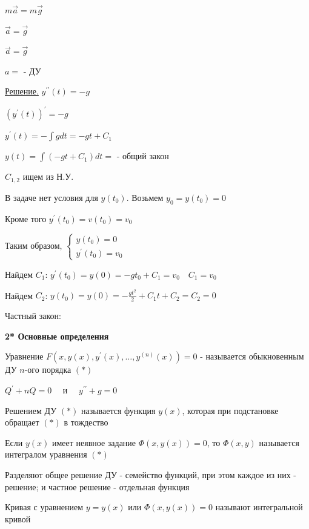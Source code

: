 \documentclass[12pt]{article}
\begin{document}
    $m\overrightarrow{a} = m\overrightarrow{g}$

    $\overrightarrow{a} = \overrightarrow{g}$

    $\overrightarrow{a} = \overrightarrow{g}$

    $a = $ - ДУ

    \underline{Решение.} \quad $y^{\prime\prime}(t) = -g$

    $(y^{\prime}(t))^\prime = -g$

    $y^{\prime}(t) = -\int g dt = -gt + C_1$

    $y(t) = \int (-gt + C_1) dt = $ - общий закон

    $C_{1,2}$ ищем из Н.У.

    В задаче нет условия для $y(t_0)$. Возьмем $y_0 = y(t_0) = 0$

    Кроме того $y^\prime(t_0) = v(t_0) = v_0$

    Таким образом, $\begin{cases}y(t_0) = 0 \\ y^\prime(t_0) = v_0\end{cases}$

    Найдем $C_1$: $y^\prime(t_0) = y(0) = -gt_0 + C_1 = v_0 \quad C_1 = v_0$

    Найдем $C_2$: $y(t_0) = y(0) = -\frac{gt^2}{2} + C_1 t + C_2 = C_2 = 0$

    Частный закон: 

    \vspace{5mm}

    \textbf{2* Основные определения}

     Уравнение $F(x, y(x), y^\prime(x), \dots, y^{(n)}(x)) = 0$ - называется обыкновенным ДУ $n$-ого порядка $(*)$

    \Ex $Q^\prime + nQ = 0 \quad$ и $\quad y^{\prime\prime} + g = 0$

     Решением ДУ $(*)$ называется функция $y(x)$, которая при подстановке обращает $(*)$ в тождество

     Если $y(x)$ имеет неявное задание $\Phi(x, y(x)) = 0$, то $\Phi(x, y)$ называется интегралом уравнения $(*)$

    \Nota Разделяют общее решение ДУ - семейство функций, при этом каждое из них - решение; и
    частное решение - отдельная функция

     Кривая с уравнением $y = y(x)$ или $\Phi(x, y(x)) = 0$ называют интегральной кривой
\end{document}
